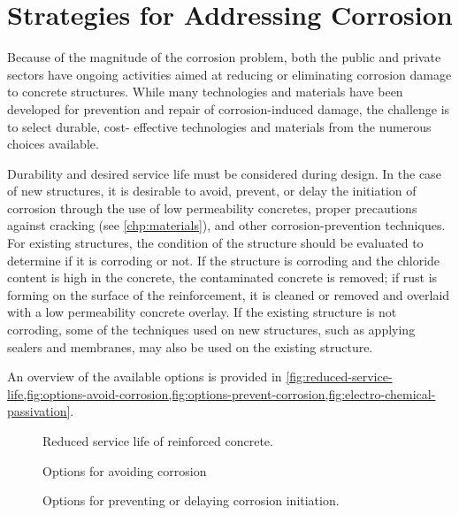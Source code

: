 \section{Strategies for Addressing Corrosion}
\label{sec:strategy-address-corrosion}
Because of the magnitude of the corrosion problem, both the public and private sectors have ongoing activities aimed at reducing or eliminating corrosion damage to concrete structures. While many technologies and materials have been developed for prevention and repair of corrosion-induced damage, the challenge is to select durable, cost- effective technologies and materials from the numerous choices available.

Durability and desired service life must be considered during design. In the case of new structures, it is desirable to avoid, prevent, or delay the initiation of corrosion through the use of low permeability concretes, proper precautions against cracking (see \cref{chp:materials}), and other corrosion-prevention techniques. For existing structures, the condition of the structure should be evaluated to determine if it is corroding or not. If the structure is corroding and the chloride content is high in the concrete, the contaminated concrete is removed; if rust is forming on the surface of the reinforcement, it is cleaned or removed and overlaid with a low permeability concrete overlay. If the existing structure is not corroding, some of the techniques used on new structures, such as applying sealers and membranes, may also be used on the existing structure.

An overview of the available options is provided in \cref{fig:reduced-service-life,fig:options-avoid-corrosion,fig:options-prevent-corrosion,fig:electro-chemical-passivation}.

\begin{figure}
  \caption{Reduced service life of reinforced concrete.}
  \label{fig:reduced-service-life}
\end{figure}

\begin{figure}
  \caption{Options for avoiding corrosion}
  \label{fig:options-avoid-corrosion}
\end{figure}

\begin{figure}
  \caption{Options for preventing or delaying corrosion initiation.}
  \label{fig:options-prevent-corrosion}
\end{figure}

